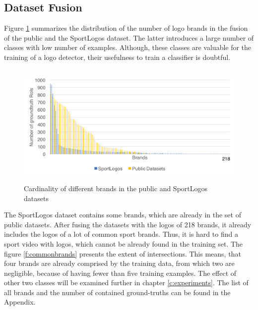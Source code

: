 \subsection{Dataset Fusion}\label{ss:datasetfusion}
Figure \ref{f:branddistribution} summarizes the distribution of the number of logo brands in the fusion of the public and the SportLogos dataset. The latter introduces a large number of classes with low number of examples. Although, these classes are valuable for the training of a logo detector, their usefulness to train a classifier is doubtful.
\begin{figure}
  \centering
  \includegraphics[height=60mm]{images/mt/branddistribution.pdf}
  \caption{Cardinality of different brands in the public and SportLogos datasets}
  \label{f:branddistribution}
\end{figure}
The SportLogos dataset contains some brands, which are already in the set of public datasets. After fusing the datasets with the logos of 218 brands, it already includes the logos of a lot of common sport brands. Thus, it is hard to find a sport video with logos, which cannot be already found in the training set. The figure \ref{f:commonbrands} presents the extent of intersections. This means, that four brands are already comprised by the training data, from which two are negligible, because of having fewer than five training examples. The effect of other two classes will be examined further in chapter \ref{c:experiments}. The list of all brands and the number of contained ground-truths can be found in the Appendix.
